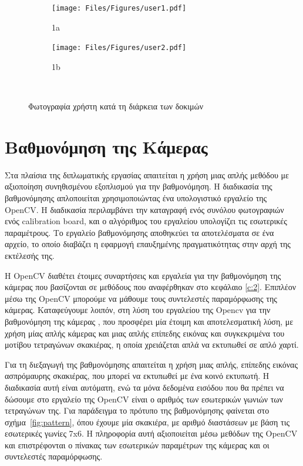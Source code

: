 \begin{figure}[H]
\begin{subfigure}{.5\textwidth}
  \centering
  \texttt{[image: Files/Figures/user1.pdf]}
  \caption{1a}
  \label{fig:sfiguser}
\end{subfigure}%
\begin{subfigure}{.5\textwidth}
  \centering
  \texttt{[image: Files/Figures/user2.pdf]}
  \caption{1b}
  \label{fig:sfig2user}
\end{subfigure}\\
\caption{Φωτογραφία χρήστη κατά τη διάρκεια των δοκιμών}
\label{fig:test}
\end{figure}



\section{Βαθμονόμηση της Κάμερας}




Στα πλαίσια της διπλωματικής εργασίας απαιτείται η χρήση μιας απλής μεθόδου με αξιοποίηση συνηθισμένου εξοπλισμού για την βαθμονόμηση. Η διαδικασία της βαθμονόμησης απλοποιείται χρησιμοποιώντας ένα υπολογιστικό εργαλείο της OpenCV. 
Η διαδικασία περιλαμβάνει την καταγραφή ενός συνόλου φωτογραφιών ενός calibration board, και ο αλγόριθμος του εργαλείου υπολογίζει τις εσωτερικές παραμέτρους.
Το εργαλείο βαθμονόμησης αποθηκεύει τα αποτελέσματα σε ένα αρχείο, το οποίο διαβάζει η εφαρμογή επαυξημένης πραγματικότητας στην αρχή της εκτέλεσής της. 



Η OpenCV διαθέτει έτοιμες συναρτήσεις και εργαλεία για την βαθμονόμηση της κάμερας που βασίζονται σε μεθόδους που αναφέρθηκαν στο κεφάλαιο \ref{c:2}. Επιπλέον μέσω της OpenCV μπορούμε να μάθουμε τους συντελεστές παραμόρφωσης της κάμερας. 
Καταφεύγουμε λοιπόν, στη λύση του εργαλείου της Opencv για την βαθμονόμηση της κάμερας \cite{calibrationtool}, που προσφέρει μία έτοιμη και αποτελεσματική λύση, με χρήση μίας απλής κάμερας και μιας απλής επίπεδης εικόνας και συγκεκριμένα του μοτίβου τετραγώνων σκακιέρας, η οποία χρειάζεται απλά να εκτυπωθεί σε απλό χαρτί. 




Για τη διεξαγωγή της βαθμονόμησης απαιτείται η χρήση μιας απλής, επίπεδης εικόνας ασπρόμαυρης σκακιέρας, που μπορεί να εκτυπωθεί με ένα κοινό εκτυπωτή. Η διαδικασία αυτή είναι αυτόματη, ενώ τα μόνα δεδομένα εισόδου που θα πρέπει να δώσουμε στο εργαλείο της OpenCV είναι ο αριθμός των εσωτερικών γωνιών των τετραγώνων της. Για παράδειγμα το πρότυπο της βαθμονόμησης φαίνεται στο σχήμα~\ref{fig:pattern}, όπου έχουμε μία σκακιέρα, με αριθμό διαστάσεων με βάση τις εσωτερικές γωνίες 7x6. Η πληροφορία αυτή αξιοποιείται μέσω μεθόδων της OpenCV και επιστρέφονται ο πίνακας των εσωτερικών παραμέτρων της κάμερας και οι συντελεστές παραμόρφωσης. 


